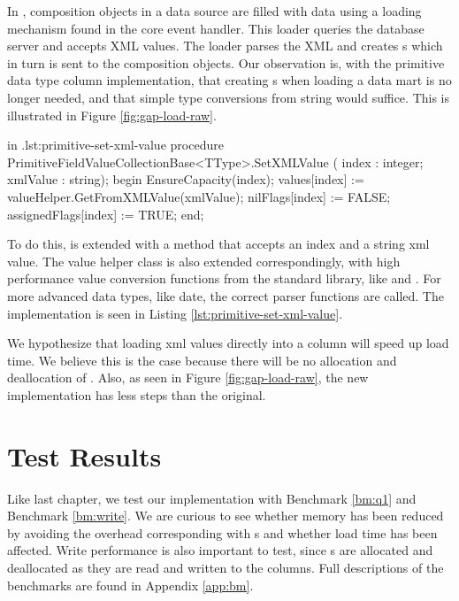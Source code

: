 In \gap, composition objects in a data source are filled with data using a loading mechanism found in the core event handler. This loader queries the database server and accepts XML values. The loader parses the XML and creates s which in turn is sent to the composition objects. Our observation is, with the primitive data type column implementation, that creating s when loading a data mart is no longer needed, and that simple type conversions from string would suffice. This is illustrated in Figure \ref{fig:gap-load-raw}.

\begin{delphicode}{ in .}{lst:primitive-set-xml-value}
procedure PrimitiveFieldValueCollectionBase<TType>.SetXMLValue
( index : integer; xmlValue : string);
begin
  EnsureCapacity(index);
  values[index] := valueHelper.GetFromXMLValue(xmlValue);
  nilFlags[index] := FALSE;
  assignedFlags[index] := TRUE;
end;
\end{delphicode}

To do this,  is extended with a method  that accepts an index and a string xml value. The value helper class is also extended correspondingly, with high performance value conversion functions from the standard library, like  and . For more advanced data types, like date, the correct parser functions are called. The implementation is seen in Listing \ref{lst:primitive-set-xml-value}.

We hypothesize that loading xml values directly into a column will speed up load time. We believe this is the case because there will be no allocation and deallocation of . Also, as seen in Figure \ref{fig:gap-load-raw}, the new implementation has less steps than the original.

\section{Test Results}
\label{sec:storage-format-test-results}
Like last chapter, we test our implementation with Benchmark \ref{bm:q1} and Benchmark \ref{bm:write}. We are curious to see whether memory has been reduced by avoiding the overhead corresponding with s and whether load time has been affected. Write performance is also important to test, since s are allocated and deallocated as they are read and written to the columns. Full descriptions of the benchmarks are found in Appendix \ref{app:bm}.

